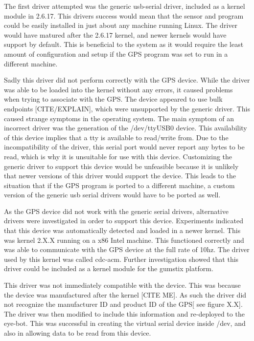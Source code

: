 The first driver attempted was the generic usb-serial driver, included as a kernel module in 2.6.17. This drivers success would mean that the sensor and program could be easily installed in just about any machine running Linux. The driver would have matured after the 2.6.17 kernel, and newer kernels would have support by default. This is beneficial to the system as it would require the least amount of configuration and setup if the GPS program was set to run in a different machine.


Sadly this driver did not perform correctly with the GPS device. While the driver was able to be loaded into the kernel without any errors, it caused problems when trying to associate with the GPS. The device appeared to use bulk endpoints [CITE/EXPLAIN], which were unsupported by the generic driver. This caused strange symptoms in the operating system. The main symptom of an incorrect driver was the generation of the /dev/ttyUSB0 device. This availability of this device implies that a tty is available to read/write from. Due to the incompatibility of the driver, this serial port would never report any bytes to be read, which is why it is unsuitable for use with this device. Customizing the generic driver to support this device would be unfeasible because it is unlikely that newer versions of this driver would support the device. This leads to the situation that if the GPS program is ported to a different machine, a custom version of the generic usb serial drivers would have to be ported as well.

As the GPS device did not work with the generic serial drivers, alternative drivers were investigated in order to support this device. Experiments indicated that this device was automatically detected and loaded in a newer kernel. This was kernel 2.X.X running on a x86 Intel machine. This functioned correctly and was able to communicate with the GPS device at the full rate of 10hz. The driver used by this kernel was called cdc-acm. Further investigation showed that this driver could be included as a kernel module for the gumstix platform.

This driver was not immediately compatible with the device. This was because the device was manufactured after the kernel [CITE ME]. As such the driver did not recognize the manufacturer ID and product ID of the GPS[ see figure X.X]. The driver was then modified to include this information and re-deployed to the eye-bot. This was successful in creating the virtual serial device inside /dev, and also in allowing data to be read from this device.

